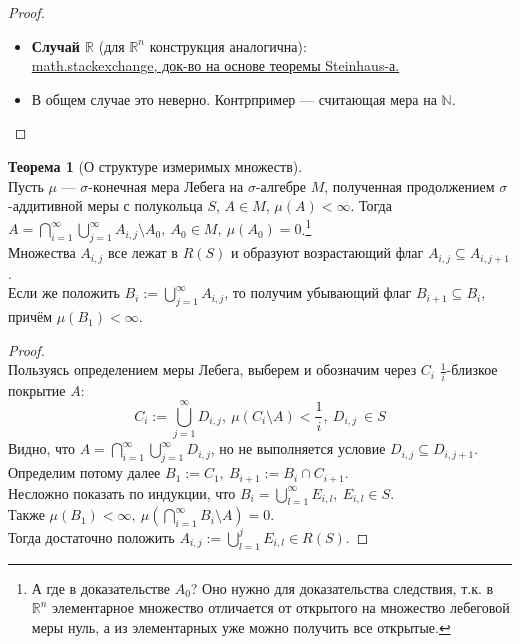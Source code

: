 \documentclass[11pt,a4paper]{report}
\def\Real{\mathbb{R}}
\def\Natural{\mathbb{N}}
\theoremstyle{definition}
\theoremstyle{definition}
\newtheorem{theorem}{Теорема}[section]
\theoremstyle{definition}
\begin{document}
	\begin{proof}$  $
			\begin{itemize}
				\item \textbf{Случай $ \Real $} (для $ \Real^{n} $ конструкция аналогична):\\ \href{https://math.stackexchange.com/questions/84491/does-the-set-of-differences-of-a-lebesgue-measurable-set-contains-elements-of-at/104126#104126}{math.stackexchange, док-во на основе теоремы Steinhaus-а.}
				\item В общем случае это неверно. Контрпример — считающая мера на $ \Natural $.
			\end{itemize}
	\end{proof}
	\begin{theorem}[О структуре измеримых множеств]$  $\\
		Пусть $ \mu $ — $ \sigma $-конечная мера Лебега на $ \sigma $-алгебре $ M $, полученная продолжением $ \sigma $-аддитивной меры с полукольца $ S $, $ A \in M $, $ \mu(A) < \infty $. Тогда $ A = \bigcap\limits_{i=1}^{\infty}{\bigcup\limits_{j=1}^{\infty}{A_{i, j}} \setminus A_{0}},\ A_{0} \in M,\ \mu(A_{0}) = 0 $.\footnote{А где в доказательстве $ A_{0} $? Оно нужно для доказательства следствия, т.к. в $ \Real^{n} $ элементарное множество отличается от открытого на множество лебеговой меры нуль, а из элементарных уже можно получить все открытые.}\\
		Множества $ A_{i, j} $  все лежат в $ R(S) $ и образуют возрастающий флаг $ A_{i, j} \subseteq A_{i, j+1} $.\\
		Если же положить $ B_{i} := \bigcup\limits_{j=1}^{\infty}{A_{i, j}} $, то получим убывающий флаг $ B_{i+1} \subseteq B_{i}  $, причём $ \mu(B_{1}) < \infty $.
	\end{theorem}
	\begin{proof}$  $\\
		Пользуясь определением меры Лебега, выберем и обозначим через $ C_{i} $ $ \frac{1}{i} $-близкое покрытие $ A $: 
		\[ C_{i} := \bigcup\limits_{j=1}^{\infty}{D_{i, j}},\ \mu(C_{i} \setminus A) < \frac{1}{i},\ D_{i, j}\ \in S \]
		Видно, что $ A = \bigcap\limits_{i=1}^{\infty}{\bigcup\limits_{j=1}^{\infty}{D_{i, j}}} $, но не выполняется условие $ D_{i, j} \subseteq D_{i, j+1} $.\\
		Определим потому далее $ B_{1} := C_{1},\ B_{i+1} := B_{i} \cap C_{i+1} $.\\ 
		Несложно показать по индукции, что $ B_{i} = \bigcup\limits_{l=1}^{\infty}{E_{i, l}},\ E_{i, l} \in S $.\\
		Также $ \mu(B_{1}) < \infty,\ \mu\left (\bigcap\limits_{i=1}^{\infty}{B_{i} \setminus A}\right ) = 0 $.\\
		Тогда достаточно положить $ A_{i, j} := \bigcup\limits_{l=1}^{j}{E_{i, l}} \in R(S) $.
	\end{proof}
\end{document}
